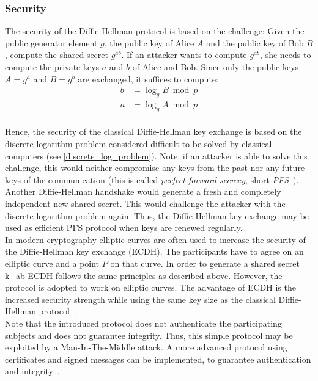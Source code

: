 \subsubsection{Security}
The security of the Diffie-Hellman protocol is based on the challenge: Given the public generator element $g$, the public key of Alice $A$ and the public key of Bob $B$, compute the shared secret $g^{ab}$.
If an attacker wants to compute $g^{ab}$, she needs to compute the private keys $a$ and $b$ of Alice and Bob. Since only the public keys $A=g^a$ and $B=g^b$ are exchanged, it suffices to compute:
\begin{equation*}
\begin{split}
b &= \log_g B \bmod p\\ 
a &= \log_g A \bmod p
\end{split}
\end{equation*}
\\
Hence, the security of the classical Diffie-Hellman key exchange is based on the discrete logarithm problem considered difficult to be solved by classical computers (see \autoref{discrete_log_problem}). Note, if an attacker is able to solve this challenge, this would neither compromise any keys from the past nor any future keys of the communication (this is called \textit{perfect forward secrecy}, short \textit{\gls{PFS}}~\parencite{ITSicherheit}). Another Diffie-Hellman handshake would generate a fresh and completely independent new shared secret. This would challenge the attacker with the discrete logarithm problem again. Thus, the Diffie-Hellman key exchange may be used as efficient \gls{PFS} protocol when keys are renewed regularly.\\
In modern cryptography elliptic curves are often used to increase the security of the Diffie-Hellman key exchange (\gls{ECDH}). The participants have to agree on an elliptic curve and a point $P$ on that curve. In order to generate a shared secret \gls{k_ab} \gls{ECDH} follows the same principles as described above. However, the protocol is adopted to work on elliptic curves. The advantage of \gls{ECDH} is the increased security strength while using the same key size as the classical Diffie-Hellman protocol~\parencite{ITSicherheit}.
\\
Note that the introduced protocol does not authenticate the participating subjects and does not guarantee integrity. Thus, this simple protocol may be exploited by a Man-In-The-Middle attack. A more advanced protocol using certificates and signed messages can be implemented, to guarantee authentication and integrity~\parencite{ITSicherheit}.

